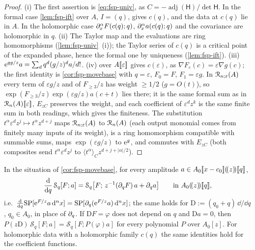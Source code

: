 \begin{proof}
(i) The first assertion is \eqref{eq:fsp-univ}, as $C=-\operatorname{adj}(\mathsf H)/\det\mathsf H$. In the formal case \cref{lem:fsp-ift} over $A$, $I=(q)$, gives $c(q)$, and the data at $c(q)$ lie in $A$. In the holomorphic case $\partial_x^\alpha F(c(q);q)$, $\partial_x^\alpha a(c(q);q)$ and the covariance are holomorphic in $q$. (ii) The Taylor map and the evaluations are ring homomorphisms (\cref{lem:fsp-univ}~(i)); the Taylor series of $c(q)$ is a critical point of the expanded phase, hence the formal one by uniqueness (\cref{lem:fsp-ift}). (iii) $\mathrm{e}^{qg/z}a=\sum_dq^d(g/z)^da/d!$. (iv)  over $A[\![ \varepsilon ]\!]$ gives $c(\varepsilon)$, as $\nabla F_\varepsilon(c)=\varepsilon\nabla g(c)$; the first identity is \cref{cor:fsp-movebase} with $q=\varepsilon$, $F_0=F$, $F_1=\varepsilon g$. In $\mathcal{R}_{n;\varepsilon}(A)$ every term of $\varepsilon g/z$ and of $F_{\geq3}/z$ has weight $\geq1/2$ ($g=O(t)$), so $\exp(F_{\geq3}/z)\exp(\varepsilon g/z)a(c+t)$ lies there; it is the same formal sum as in $\mathcal{R}_n(A)[\![ \varepsilon ]\!]$, $E_{zC}$ preserves the weight, and each coefficient of $\varepsilon^dz^k$ is the same finite sum in both readings, which gives the finiteness. The substitution $t^\alpha\varepsilon^dz^j\mapsto t^\alpha z^{d+j}$ maps $\mathcal{R}_{n;\varepsilon}(A)$ to $\mathcal{R}_n(A)$ (each output monomial comes from finitely many inputs of its weight), is a ring homomorphism compatible with summable sums, maps $\exp(\varepsilon g/z)$ to $\mathrm{e}^g$, and commutes with $E_{zC}$ (both composites send $t^\alpha\varepsilon^dz^j$ to $\langle t^\alpha\rangle_Cz^{d+j+|\alpha|/2}$).
\end{proof}

\begin{lem}
\label{lem:fsp-dq}
In the situation of \cref{cor:fsp-movebase}, for every amplitude $a\in A_0[\![ x-c_0 ]\!](\!(z)\!)[\![ q ]\!]$,
\[
\frac{\mathrm{d}}{\mathrm{d} q}\,\mathcal S_q[F;a]=\mathcal S_q\bigl[F;\,z^{-1}(\partial_qF)\,a+\partial_qa\bigr]\qquad\text{in }A_0(\!(z)\!)[\![ q ]\!],
\]
i.e.\ $\frac{\mathrm{d}}{\mathrm{d} q}\mathrm{SP}[\mathrm{e}^{F/z}a\,\mathrm{d}^nx]=\mathrm{SP}[\partial_q(\mathrm{e}^{F/z}a)\,\mathrm{d}^nx]$; the same holds for $\mathrm D:=(q_0+q)\,\dd/\dd q$, $q_0\in A_0$, in place of $\partial_q$. If $\mathrm DF=\varphi$ does not depend on $q$ and $\mathrm Da=0$, then $P(z\mathrm D)\,\mathcal S_q[F;a]=\mathcal S_q[F;P(\varphi)a]$ for every polynomial $P$ over $A_0[z]$. For holomorphic data with a holomorphic family $c(q)$ the same identities hold for the coefficient functions.
\end{lem}

